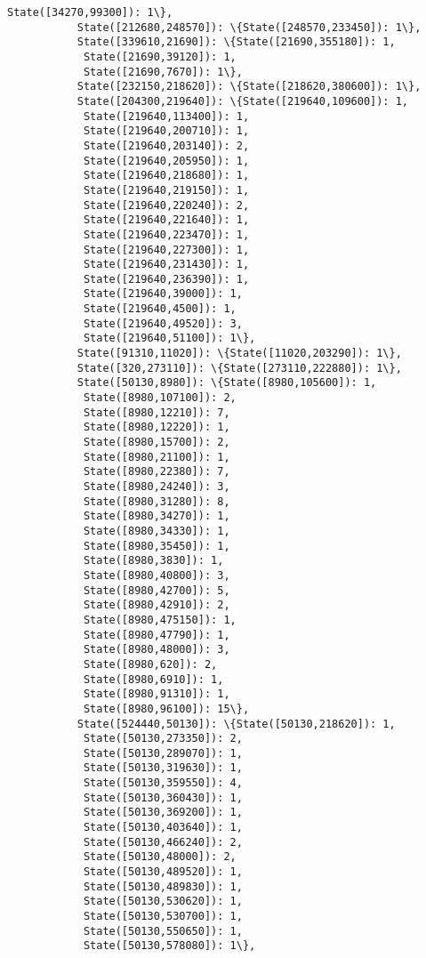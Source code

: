 \documentclass[11pt]{article}
\begin{document}
\begin{Verbatim}[commandchars=\\\{\}]
            State([34270,99300]): 1\},
           State([212680,248570]): \{State([248570,233450]): 1\},
           State([339610,21690]): \{State([21690,355180]): 1,
            State([21690,39120]): 1,
            State([21690,7670]): 1\},
           State([232150,218620]): \{State([218620,380600]): 1\},
           State([204300,219640]): \{State([219640,109600]): 1,
            State([219640,113400]): 1,
            State([219640,200710]): 1,
            State([219640,203140]): 2,
            State([219640,205950]): 1,
            State([219640,218680]): 1,
            State([219640,219150]): 1,
            State([219640,220240]): 2,
            State([219640,221640]): 1,
            State([219640,223470]): 1,
            State([219640,227300]): 1,
            State([219640,231430]): 1,
            State([219640,236390]): 1,
            State([219640,39000]): 1,
            State([219640,4500]): 1,
            State([219640,49520]): 3,
            State([219640,51100]): 1\},
           State([91310,11020]): \{State([11020,203290]): 1\},
           State([320,273110]): \{State([273110,222880]): 1\},
           State([50130,8980]): \{State([8980,105600]): 1,
            State([8980,107100]): 2,
            State([8980,12210]): 7,
            State([8980,12220]): 1,
            State([8980,15700]): 2,
            State([8980,21100]): 1,
            State([8980,22380]): 7,
            State([8980,24240]): 3,
            State([8980,31280]): 8,
            State([8980,34270]): 1,
            State([8980,34330]): 1,
            State([8980,35450]): 1,
            State([8980,3830]): 1,
            State([8980,40800]): 3,
            State([8980,42700]): 5,
            State([8980,42910]): 2,
            State([8980,475150]): 1,
            State([8980,47790]): 1,
            State([8980,48000]): 3,
            State([8980,620]): 2,
            State([8980,6910]): 1,
            State([8980,91310]): 1,
            State([8980,96100]): 15\},
           State([524440,50130]): \{State([50130,218620]): 1,
            State([50130,273350]): 2,
            State([50130,289070]): 1,
            State([50130,319630]): 1,
            State([50130,359550]): 4,
            State([50130,360430]): 1,
            State([50130,369200]): 1,
            State([50130,403640]): 1,
            State([50130,466240]): 2,
            State([50130,48000]): 2,
            State([50130,489520]): 1,
            State([50130,489830]): 1,
            State([50130,530620]): 1,
            State([50130,530700]): 1,
            State([50130,550650]): 1,
            State([50130,578080]): 1\},

\end{Verbatim}
\end{document}
